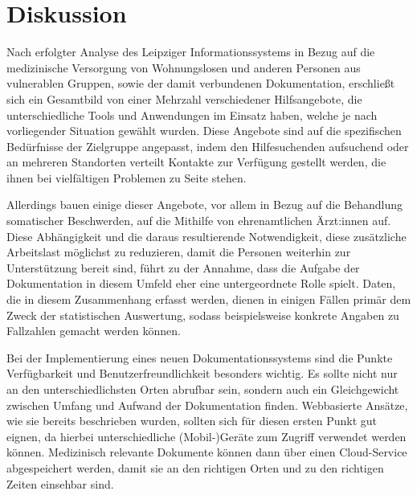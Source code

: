 \chapter{Diskussion}\label{ch:discussion}

Nach erfolgter Analyse des Leipziger Informationssystems in Bezug auf die medizinische Versorgung von Wohnungslosen und anderen Personen aus vulnerablen Gruppen, sowie der damit verbundenen Dokumentation, erschließt sich ein Gesamtbild von einer Mehrzahl verschiedener Hilfsangebote, die unterschiedliche Tools und Anwendungen im Einsatz haben, welche je nach vorliegender Situation gewählt wurden. Diese Angebote sind auf die spezifischen Bedürfnisse der Zielgruppe angepasst, indem den Hilfesuchenden aufsuchend oder an mehreren Standorten verteilt Kontakte zur Verfügung gestellt werden, die ihnen bei vielfältigen Problemen zu Seite stehen.

Allerdings bauen einige dieser Angebote, vor allem in Bezug auf die Behandlung somatischer Beschwerden, auf die Mithilfe von ehrenamtlichen Ärzt:innen auf. Diese Abhängigkeit und die daraus resultierende Notwendigkeit, diese zusätzliche Arbeitslast möglichst zu reduzieren, damit die Personen weiterhin zur Unterstützung bereit sind, führt zu der Annahme, dass die Aufgabe der Dokumentation in diesem Umfeld eher eine untergeordnete Rolle spielt. Daten, die in diesem Zusammenhang erfasst werden, dienen in einigen Fällen primär dem Zweck der statistischen Auswertung, sodass beispielsweise konkrete Angaben zu Fallzahlen gemacht werden können.

Bei der Implementierung eines neuen Dokumentationssystems sind die Punkte Verfügbarkeit und Benutzerfreundlichkeit besonders wichtig. Es sollte nicht nur an den unterschiedlichsten Orten abrufbar sein, sondern auch ein Gleichgewicht zwischen Umfang und Aufwand der Dokumentation finden. Webbasierte Ansätze, wie sie bereits beschrieben wurden, sollten sich für diesen ersten Punkt gut eignen, da hierbei unterschiedliche (Mobil-)Geräte zum Zugriff verwendet werden können. Medizinisch relevante Dokumente können dann über einen Cloud-Service abgespeichert werden, damit sie an den richtigen Orten und zu den richtigen Zeiten einsehbar sind.